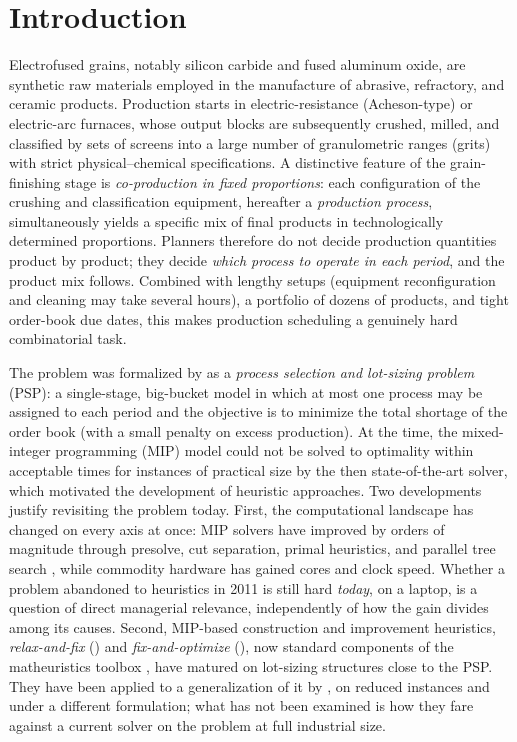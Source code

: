 \section{Introduction}
\label{sec:introduction}

Electrofused grains, notably silicon carbide and fused aluminum oxide,
are synthetic raw materials employed in the manufacture of abrasive,
refractory, and ceramic products. Production starts in
electric-resistance (Acheson-type) or electric-arc furnaces, whose
output blocks are subsequently crushed, milled, and classified by sets
of screens into a large number of granulometric ranges (grits) with
strict physical--chemical specifications. A distinctive feature of the
grain-finishing stage is \emph{co-production in fixed proportions}:
each configuration of the crushing and classification equipment, hereafter a \emph{production process}, simultaneously yields a
specific mix of final products in technologically determined
proportions. Planners therefore do not decide production quantities
product by product; they decide \emph{which process to operate in each
period}, and the product mix follows. Combined with lengthy setups
(equipment reconfiguration and cleaning may take several hours),
a portfolio of dozens of products, and tight order-book due dates,
this makes production scheduling a genuinely hard combinatorial task.

The problem was formalized by \citet{luche2009combining} as a
\emph{process selection and lot-sizing problem} (PSP): a single-stage,
big-bucket model in which at most one process may be assigned to each
period and the objective is to minimize the total shortage of the
order book (with a small penalty on excess production). At the time,
the mixed-integer programming (MIP) model could not be solved to
optimality within acceptable times for instances of practical size by
the then state-of-the-art solver, which motivated the development of
heuristic approaches. Two developments justify revisiting the problem
today. First, the computational landscape has changed on
every axis at once: MIP solvers have improved by orders of magnitude
through presolve, cut separation, primal heuristics, and parallel tree
search \citep{koch2022progress,achterberg2013analyzing,achterberg2020presolve},
while commodity hardware has gained cores and clock speed. Whether a
problem abandoned to heuristics in 2011 is still hard \emph{today}, on
a laptop, is a question of direct managerial relevance, independently
of how the gain divides among its causes. Second, MIP-based
construction and improvement heuristics, \emph{relax-and-fix} (\RF) and \emph{fix-and-optimize} (\FO), now
standard components of the matheuristics toolbox
\citep{sahling2009solving,helber2010fix,toledo2015relax}, have
matured on lot-sizing structures close to the PSP. They have been
applied to a generalization of it by \citet{villasboas2021modeling},
on reduced instances and under a different formulation; what has not
been examined is how they fare against a current solver on the problem
at full industrial size.

